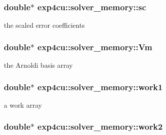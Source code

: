\subsubsection[{\texorpdfstring{sc}{sc}}]{\setlength{\rightskip}{0pt plus 5cm}double$\ast$ exp4cu\+::solver\+\_\+memory\+::sc}\hypertarget{structexp4cu_1_1solver__memory_afb9f6a3602a177e7283a45afade87695}{}\label{structexp4cu_1_1solver__memory_afb9f6a3602a177e7283a45afade87695}


the scaled error coefficients 

\subsubsection[{\texorpdfstring{Vm}{Vm}}]{\setlength{\rightskip}{0pt plus 5cm}double$\ast$ exp4cu\+::solver\+\_\+memory\+::\+Vm}\hypertarget{structexp4cu_1_1solver__memory_a089d1909b39f39551063214762c66e08}{}\label{structexp4cu_1_1solver__memory_a089d1909b39f39551063214762c66e08}


the Arnoldi basis array 

\subsubsection[{\texorpdfstring{work1}{work1}}]{\setlength{\rightskip}{0pt plus 5cm}double$\ast$ exp4cu\+::solver\+\_\+memory\+::work1}\hypertarget{structexp4cu_1_1solver__memory_aecfb53728ed87d6857212dd1e19345a8}{}\label{structexp4cu_1_1solver__memory_aecfb53728ed87d6857212dd1e19345a8}


a work array 

\subsubsection[{\texorpdfstring{work2}{work2}}]{\setlength{\rightskip}{0pt plus 5cm}double$\ast$ exp4cu\+::solver\+\_\+memory\+::work2}\hypertarget{structexp4cu_1_1solver__memory_a571d5da694382eb078504242f69c4b78}{}\label{structexp4cu_1_1solver__memory_a571d5da694382eb078504242f69c4b78}


